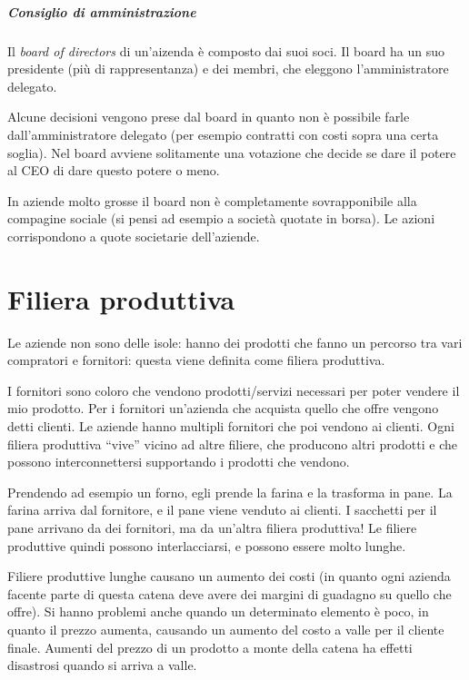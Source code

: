 \paragraph*{Consiglio di amministrazione} Il \textit{board of directors} di
un'aizenda è composto dai suoi soci. Il board ha un suo presidente (più di
rappresentanza) e dei membri, che eleggono l'amministratore delegato.

Alcune decisioni vengono prese dal board in quanto non è possibile farle
dall'amministratore delegato (per esempio contratti con costi sopra una certa
soglia). Nel board avviene solitamente una votazione che decide se dare il
potere al CEO di dare questo potere o meno.

In aziende molto grosse il board non è completamente sovrapponibile alla
compagine sociale (si pensi ad esempio a società quotate in borsa). Le azioni
corrispondono a quote societarie dell'aziende.

\chapter{Filiera produttiva}


Le aziende non sono delle isole: hanno dei prodotti che fanno un percorso tra
vari compratori e fornitori: questa viene definita come filiera produttiva.

I fornitori sono coloro che vendono prodotti/servizi necessari per poter
vendere il mio prodotto. Per i fornitori un'azienda che acquista quello che
offre vengono detti clienti. Le aziende hanno multipli fornitori che poi
vendono ai clienti. Ogni filiera produttiva ``vive'' vicino ad altre filiere,
che producono altri prodotti e che possono interconnettersi supportando i
prodotti che vendono.

Prendendo ad esempio un forno, egli prende la farina e la trasforma in pane. La
farina arriva dal fornitore, e il pane viene venduto ai clienti. I sacchetti
per il pane arrivano da dei fornitori, ma da un'altra filiera produttiva! Le
filiere produttive quindi possono interlacciarsi, e possono essere molto lunghe.

Filiere produttive lunghe causano un aumento dei costi (in quanto ogni azienda
facente parte di questa catena deve avere dei margini di guadagno su quello che
offre). Si hanno problemi anche quando un determinato elemento è poco, in
quanto il prezzo aumenta, causando un aumento del costo a valle per il cliente
finale. Aumenti del prezzo di un prodotto a monte della catena ha effetti
disastrosi quando si arriva a valle.

